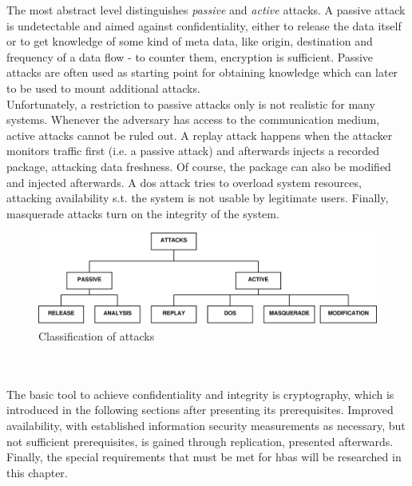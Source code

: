 The most abstract level distinguishes \textit{passive} and \textit{active} attacks. A passive
attack is undetectable and aimed against confidentiality, either to release the data itself or to get knowledge of some kind of meta data, like origin,
destination and frequency of a data flow - to counter them, encryption is sufficient. Passive attacks are often used as starting point for obtaining knowledge which can later to be used to mount 
additional attacks.
\\
Unfortunately, a restriction to passive attacks only is not realistic for many systems. Whenever the adversary has access to the communication medium, active attacks
cannot be ruled out. A replay attack happens when the attacker monitors traffic first (i.e. a passive attack) and afterwards injects a recorded package, 
attacking data freshness. Of course,
the package can also be modified and injected afterwards.
A \gls{dos} attack tries to overload system resources, attacking availability s.t. the system is not
usable by legitimate users. Finally, masquerade attacks turn on the integrity of the system.
\begin{figure}
    \centering
    \includegraphics[width=1\textwidth]{figures/attacks.eps}
    \caption{Classification of attacks}
    \label{fig:attacks}
\end{figure}
\\
\\
The basic tool to achieve confidentiality and integrity is cryptography, which is introduced in the following sections after 
presenting its prerequisites. Improved availability, with established 
information security measurements as necessary, but not sufficient prerequisites, is gained through replication, presented afterwards.
Finally, the special requirements that must be met for \gls{hbas} will be researched in this chapter.

